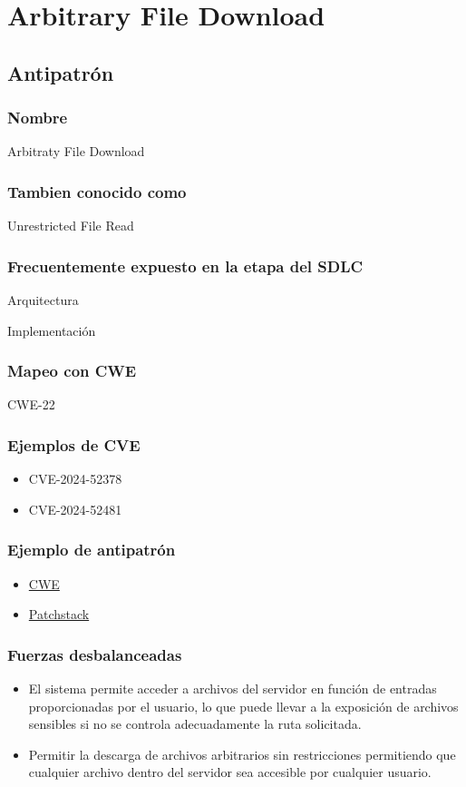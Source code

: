 \chapter{Arbitrary File Download}
\section{Antipatrón}
\subsection*{Nombre}
Arbitraty File Download
\subsection*{Tambien conocido como}
Unrestricted File Read

\subsection*{Frecuentemente expuesto en la etapa del SDLC}
Arquitectura

Implementación
\subsection*{Mapeo con CWE}
CWE-22
\subsection*{Ejemplos de CVE}
\begin{itemize}
    \item CVE-2024-52378
    \item CVE-2024-52481
\end{itemize}

\subsection*{Ejemplo de antipatrón}
\begin{itemize}
    \item \href{https://cwe.mitre.org/data/definitions/22.html}{CWE}
    \item \href{https://patchstack.com/academy/wordpress/vulnerabilities/arbitrary-file-read/}{Patchstack}
\end{itemize}
\subsection*{Fuerzas desbalanceadas}

 \begin{itemize}
     \item El sistema permite acceder a archivos del servidor en función de entradas proporcionadas por el usuario, lo que puede llevar a la exposición de archivos sensibles si no se controla adecuadamente la ruta solicitada.
     \item Permitir la descarga de archivos arbitrarios sin restricciones permitiendo que cualquier archivo dentro del servidor sea accesible por cualquier usuario.
 \end{itemize}
 
